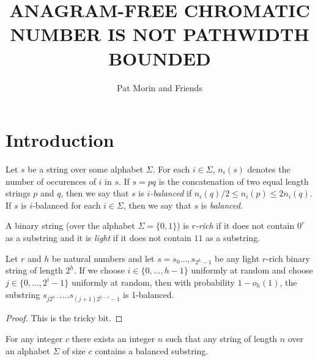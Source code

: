 \documentclass{patmorin}
\title{\MakeUppercase{Anagram-Free Chromatic Number is not Pathwidth Bounded}}
\author{Pat Morin and Friends}%
\begin{document}
\maketitle
%
\begin{abstract}
\end{abstract}
%
%


\section{Introduction}

Let $s$ be a string over some alphabet $\Sigma$.  For each $i\in\Sigma$,
$n_i(s)$ denotes the number of occurences of $i$ in $s$.  If $s=pq$ is
the concatenation of two equal length strings $p$ and $q$, then we say
that $s$ is \emph{$i$-balanced} if $n_i(q)/2\le n_i(p)\le 2n_i(q)$.
If $s$ is $i$-balanced for each $i\in \Sigma$, then we say that $s$
is \emph{balanced}.

A binary string (over the alphabet $\Sigma=\{0,1\}$) is \emph{$r$-rich}
if it does not contain $0^r$ as a substring and it is \emph{light}
if it does not contain $11$ as a substring.


\begin{lem}
  Let $r$ and $h$ be natural numbers and let $s=s_0\ldots,s_{2^h-1}$ be any light $r$-rich
  binary string of length $2^h$.  If we choose $i\in\{0,\ldots,h-1\}$ uniformly at random and choose $j\in\{0,\ldots,2^{i}-1\}$ uniformly at random, then
  with probability $1-o_h(1)$, the substring $s_{j2^{h-i}}\ldots s_{(j+1)2^{h-i}-1}$ is 1-balanced.
\end{lem}

\begin{proof}
  This is the tricky bit.
\end{proof}

\begin{lem}
  For any integer $c$ there exists an integer $n$ such that any string
  of length $n$ over an alphabet $\Sigma$ of size $c$ contains a balanced
  substring.
\end{lem}
\end{document}
